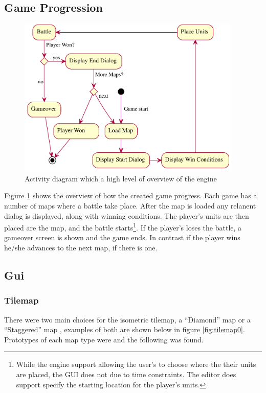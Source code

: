 \subsection{Game Progression}
\begin{figure}[htbp]
	\centering
		\includegraphics[height=3in]{figures/game.pdf}
	\caption{Activity diagram which a high level of overview of the engine}
	\label{fig:figures_game}
\end{figure}

Figure \ref{fig:figures_game} shows the overview of how the created game progress.  Each game has a number of maps where a battle take place. After the map is loaded any relanent dialog is displayed, along with winning conditions. The player's units are then placed are the map, and the battle starts\footnote{While the engine support allowing the user's to choose where the their units are placed, the GUI does not due to time constraints. The editor does support specify the starting location for the player's units.}. If the player's loses the battle, a gameover screen is shown and the game ends. In contrast if the player wins he/she advances to the next map, if there is one.    

\subsection{Gui}

\subsubsection{Tilemap}
\label{sub:tilemap}

There were two main choices for the isometric tilemap, a ``Diamond'' map or a  ``Staggered'' map \cite{isometric_game_programming}, examples of both are shown below in figure \ref{fig:tilemap0}. Prototypes of each map type were and the following was found.  

